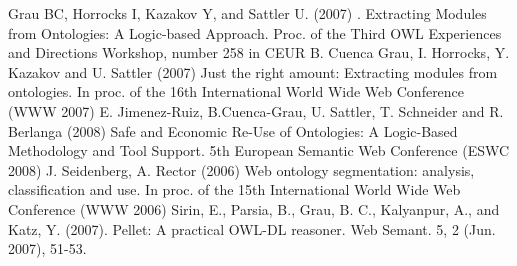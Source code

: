 \documentclass{ao2e}%
\begin{document}
\begin{thebibliography}{}


Grau BC, Horrocks I, Kazakov Y, and Sattler U. (2007) . Extracting Modules from Ontologies: A Logic-based Approach. Proc. of the Third OWL Experiences and Directions Workshop, number 258 in CEUR 
 B. Cuenca Grau, I. Horrocks, Y. Kazakov and U. Sattler (2007) Just the right amount: Extracting modules from ontologies. In proc. of the 16th International World Wide Web Conference (WWW 2007) 
 E. Jimenez-Ruiz, B.Cuenca-Grau, U. Sattler, T. Schneider and R. Berlanga (2008) Safe and Economic Re-Use of Ontologies: A Logic-Based Methodology and Tool Support. 5th European Semantic Web Conference (ESWC 2008) 
 J. Seidenberg, A. Rector (2006) Web ontology segmentation: analysis, classification and use. In proc. of the 15th International World Wide Web Conference (WWW 2006) 
 Sirin, E., Parsia, B., Grau, B. C., Kalyanpur, A., and Katz, Y. (2007). Pellet: A practical OWL-DL reasoner. Web Semant. 5, 2 (Jun. 2007), 51-53. 
 
 
 

\end{thebibliography}
\end{document}
